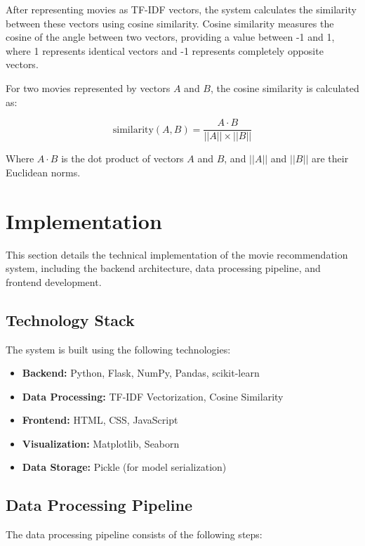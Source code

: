\documentclass[12pt,a4paper]{article}
\begin{document}
After representing movies as TF-IDF vectors, the system calculates the similarity between these vectors using cosine similarity. Cosine similarity measures the cosine of the angle between two vectors, providing a value between -1 and 1, where 1 represents identical vectors and -1 represents completely opposite vectors.

For two movies represented by vectors $A$ and $B$, the cosine similarity is calculated as:

\begin{equation}
    \text{similarity}(A, B) = \frac{A \cdot B}{||A|| \times ||B||}
\end{equation}

Where $A \cdot B$ is the dot product of vectors $A$ and $B$, and $||A||$ and $||B||$ are their Euclidean norms.

\section{Implementation}

This section details the technical implementation of the movie recommendation system, including the backend architecture, data processing pipeline, and frontend development.

\subsection{Technology Stack}

The system is built using the following technologies:

\begin{itemize}
    \item \textbf{Backend:} Python, Flask, NumPy, Pandas, scikit-learn
    \item \textbf{Data Processing:} TF-IDF Vectorization, Cosine Similarity
    \item \textbf{Frontend:} HTML, CSS, JavaScript
    \item \textbf{Visualization:} Matplotlib, Seaborn
    \item \textbf{Data Storage:} Pickle (for model serialization)
\end{itemize}

\subsection{Data Processing Pipeline}

The data processing pipeline consists of the following steps:
\end{document}

